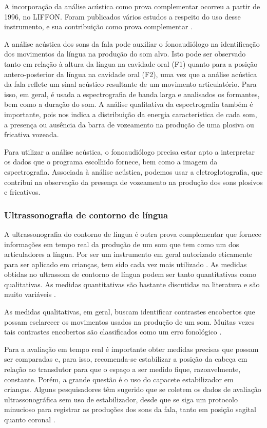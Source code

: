 \documentclass[output=paper,colorlinks,citecolor=brown,booklanguage=portuguese]{langscibook}
\begin{document}
A incorporação da análise acústica como prova complementar ocorreu a partir de 1996, no LIFFON. Foram publicados vários estudos a respeito do uso desse instrumento, e sua contribuição como prova complementar \citep{PaganNeves2007, PaganNeves2010}.

A análise acústica dos sons da fala pode auxiliar o fonoaudiólogo na identificação dos movimentos da língua na produção do som alvo. Isto pode ser observado tanto em relação à altura da língua na cavidade oral (F1) quanto para a posição antero-posterior da língua na cavidade oral (F2), uma vez que a análise acústica da fala reflete um sinal acústico resultante de um movimento articulatório. Para isso, em geral, é usada a espectrografia de banda larga e analisados os formantes, bem como a duração do som. A análise qualitativa da espectrografia também é importante, pois nos indica a distribuição da energia característica de cada som, a presença ou ausência da barra de vozeamento na produção de uma plosiva ou fricativa vozeada. 

Para utilizar a análise acústica, o fonoaudiólogo precisa estar apto a interpretar os dados que o programa escolhido fornece, bem como a imagem da espectrografia. Associada à análise acústica, podemos usar a eletroglotografia, que contribui na observação da presença de vozeamento na produção dos sons plosivos e fricativos.

\subsubsection{Ultrassonografia de contorno de língua}

A ultrassonografia do contorno de língua é outra prova complementar que fornece informações em tempo real da produção de um som que tem como um dos articuladores a língua. Por ser um instrumento em geral autorizado eticamente para ser aplicado em crianças, tem sido cada vez mais utilizado \citep{Preston2017}. As medidas obtidas no ultrassom de contorno de língua podem ser tanto quantitativas como qualitativas. As medidas quantitativas são bastante discutidas na literatura e são muito variáveis \citep{Zharkova2015, Silva2017, Francisco2017}.

As medidas qualitativas, em geral, buscam identificar contrastes encobertos que possam esclarecer os movimentos usados na produção de um som. Muitas vezes tais contrastes encobertos são classificados como um erro fonológico \citep{McAllisterByun2016}.

Para a avaliação em tempo real é importante obter medidas precisas que possam ser comparadas e, para isso, recomenda-se estabilizar a posição da cabeça em relação ao transdutor para que o espaço a ser medido fique, razoavelmente, constante. Porém, a grande questão é o uso do capacete estabilizador em crianças. Alguns pesquisadores têm sugerido que se coletem os dados de avaliação ultrassonográfica sem uso de estabilizador, desde que se siga um protocolo minucioso para registrar as produções dos sons da fala, tanto em posição sagital quanto coronal \citep{Preston2017}.
\end{document}
